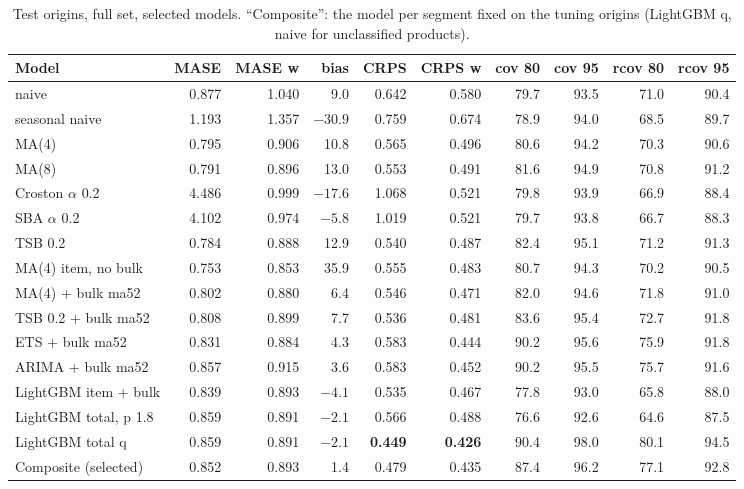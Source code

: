 \documentclass[11pt,a4paper]{article}
\begin{document}
\begin{table}[ht]
  \centering
  \footnotesize
  \setlength{\tabcolsep}{4pt}
  \caption{Test origins, full set, selected models. ``Composite'': the model per segment fixed
    on the tuning origins (LightGBM q, naive for unclassified products).}
  \label{tab:test-full}
  \begin{tabular}{l rrrrr rrrr}
    \toprule
    Model & MASE & MASE w & bias & CRPS & CRPS w & cov 80 & cov 95 & rcov 80 & rcov 95 \\
    \midrule
    naive & 0.877 & 1.040 & 9.0 & 0.642 & 0.580 & 79.7 & 93.5 & 71.0 & 90.4 \\
    seasonal naive & 1.193 & 1.357 & $-30.9$ & 0.759 & 0.674 & 78.9 & 94.0 & 68.5 & 89.7 \\
    MA(4) & 0.795 & 0.906 & 10.8 & 0.565 & 0.496 & 80.6 & 94.2 & 70.3 & 90.6 \\
    MA(8) & 0.791 & 0.896 & 13.0 & 0.553 & 0.491 & 81.6 & 94.9 & 70.8 & 91.2 \\
    Croston $\alpha$ 0.2 & 4.486 & 0.999 & $-17.6$ & 1.068 & 0.521 & 79.8 & 93.9 & 66.9 & 88.4 \\
    SBA $\alpha$ 0.2 & 4.102 & 0.974 & $-5.8$ & 1.019 & 0.521 & 79.7 & 93.8 & 66.7 & 88.3 \\
    TSB 0.2 & 0.784 & 0.888 & 12.9 & 0.540 & 0.487 & 82.4 & 95.1 & 71.2 & 91.3 \\
    MA(4) item, no bulk & 0.753 & 0.853 & 35.9 & 0.555 & 0.483 & 80.7 & 94.3 & 70.2 & 90.5 \\
    MA(4) + bulk ma52 & 0.802 & 0.880 & 6.4 & 0.546 & 0.471 & 82.0 & 94.6 & 71.8 & 91.0 \\
    TSB 0.2 + bulk ma52 & 0.808 & 0.899 & 7.7 & 0.536 & 0.481 & 83.6 & 95.4 & 72.7 & 91.8 \\
    ETS + bulk ma52 & 0.831 & 0.884 & 4.3 & 0.583 & 0.444 & 90.2 & 95.6 & 75.9 & 91.8 \\
    ARIMA + bulk ma52 & 0.857 & 0.915 & 3.6 & 0.583 & 0.452 & 90.2 & 95.5 & 75.7 & 91.6 \\
    LightGBM item + bulk & 0.839 & 0.893 & $-4.1$ & 0.535 & 0.467 & 77.8 & 93.0 & 65.8 & 88.0 \\
    LightGBM total, p 1.8 & 0.859 & 0.891 & $-2.1$ & 0.566 & 0.488 & 76.6 & 92.6 & 64.6 & 87.5 \\
    LightGBM total q & 0.859 & 0.891 & $-2.1$ & \textbf{0.449} & \textbf{0.426} & 90.4 & 98.0 &
      80.1 & 94.5 \\
    Composite (selected) & 0.852 & 0.893 & 1.4 & 0.479 & 0.435 & 87.4 & 96.2 & 77.1 & 92.8 \\
    \bottomrule
  \end{tabular}
\end{table}
\end{document}
